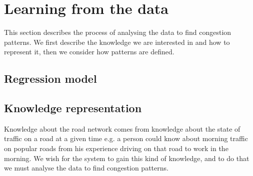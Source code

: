 \section{Learning from the data}
This section describes the process of analysing the data to find congestion patterns. We first describe the knowledge we are interested in and how to represent it, then we consider how patterns are defined.

\subsection{Regression model}

\subsection{Knowledge representation}
Knowledge about the road network comes from knowledge about the state of traffic on a road at a given time e.g. a  person could know about morning traffic on popular roads from his experience driving on that road to work in the morning. We wish for the system to gain this kind of knowledge, and to do that we must analyse the data to find congestion patterns.
